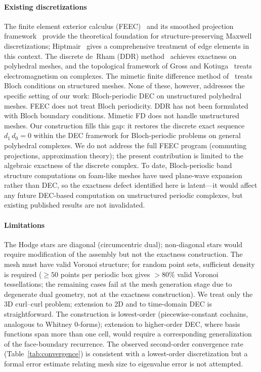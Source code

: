 \documentclass[preprint,12pt]{elsarticle}
\begin{document}
\paragraph{Existing discretizations}
The finite element exterior calculus (FEEC)~\cite{Arnold2006,Arnold2010} and its smoothed projection framework~\cite{Christiansen2008} provide the theoretical foundation for structure-preserving Maxwell discretizations; Hiptmair~\cite{Hiptmair2002} gives a comprehensive treatment of edge elements in this context. The discrete de~Rham (DDR) method~\cite{DiPietro2020} achieves exactness on polyhedral meshes, and the topological framework of Gross and Kotiuga~\cite{Gross2004} treats electromagnetism on complexes. The mimetic finite difference method of~\cite{Jin2025} treats Bloch conditions on structured meshes. None of these, however, addresses the specific setting of our work: Bloch-periodic DEC on unstructured polyhedral meshes. FEEC does not treat Bloch periodicity. DDR has not been formulated with Bloch boundary conditions. Mimetic FD does not handle unstructured meshes. Our construction fills this gap: it restores the discrete exact sequence $d_1\,d_0 = 0$ within the DEC framework for Bloch-periodic problems on general polyhedral complexes. We do not address the full FEEC program (commuting projections, approximation theory); the present contribution is limited to the algebraic exactness of the discrete complex. To date, Bloch-periodic band structure computations on foam-like meshes have used plane-wave expansion~\cite{Klatt2019} rather than DEC, so the exactness defect identified here is latent---it would affect any future DEC-based computation on unstructured periodic complexes, but existing published results are not invalidated.

\paragraph{Limitations}
The Hodge stars are diagonal (circumcentric dual); non-diagonal stars would require modification of the assembly but not the exactness construction. The mesh must have valid Voronoi structure; for random point sets, sufficient density is required ($\geq 50$ points per periodic box gives $> 80\%$ valid Voronoi tessellations; the remaining cases fail at the mesh generation stage due to degenerate dual geometry, not at the exactness construction). We treat only the 3D curl--curl problem; extension to 2D and to time-domain DEC is straightforward. The construction is lowest-order (piecewise-constant cochains, analogous to Whitney 0-forms); extension to higher-order DEC, where basis functions span more than one cell, would require a corresponding generalization of the face-boundary recurrence. The observed second-order convergence rate (Table~\ref{tab:convergence}) is consistent with a lowest-order discretization but a formal error estimate relating mesh size to eigenvalue error is not attempted.
\end{document}
